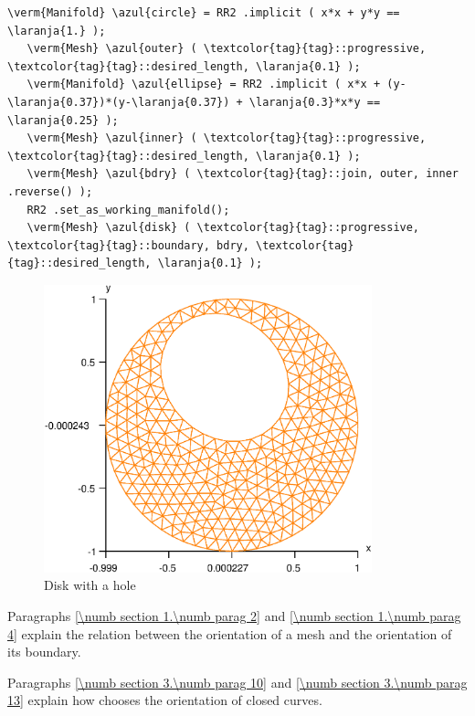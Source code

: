 \begin{Verbatim}[commandchars=\\\{\},formatcom=\small\tt,frame=single,
   label=parag-\ref{\numb section 3.\numb parag 3}.cpp,rulecolor=\color{coment},
   baselinestretch=0.94,framesep=2mm                                            ]
   \verm{Manifold} \azul{circle} = RR2 .implicit ( x*x + y*y == \laranja{1.} );
   \verm{Mesh} \azul{outer} ( \textcolor{tag}{tag}::progressive, \textcolor{tag}{tag}::desired_length, \laranja{0.1} );
   \verm{Manifold} \azul{ellipse} = RR2 .implicit ( x*x + (y-\laranja{0.37})*(y-\laranja{0.37}) + \laranja{0.3}*x*y == \laranja{0.25} );
   \verm{Mesh} \azul{inner} ( \textcolor{tag}{tag}::progressive, \textcolor{tag}{tag}::desired_length, \laranja{0.1} );
   \verm{Mesh} \azul{bdry} ( \textcolor{tag}{tag}::join, outer, inner .reverse() );
   RR2 .set_as_working_manifold();
   \verm{Mesh} \azul{disk} ( \textcolor{tag}{tag}::progressive, \textcolor{tag}{tag}::boundary, bdry, \textcolor{tag}{tag}::desired_length, \laranja{0.1} );
\end{Verbatim}

\begin{figure}[ht] \centering
 \includegraphics[width=95mm]{disk-with-hole}
  \caption{Disk with a hole}
  \label{\numb section 3.\numb fig 2}
\end{figure}

Paragraphs \ref{\numb section 1.\numb parag 2} and \ref{\numb section 1.\numb parag 4} explain
the relation between the orientation of a mesh and the orientation of its boundary.

Paragraphs \ref{\numb section 3.\numb parag 10} and \ref{\numb section 3.\numb parag 13}
explain how {\maniFEM} chooses the orientation of closed curves.


